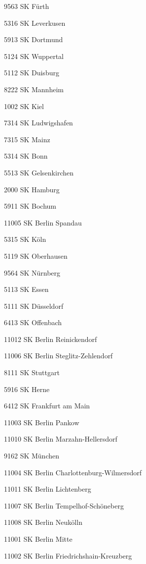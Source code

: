9563  SK Fürth

5316  SK Leverkusen

5913  SK Dortmund

5124  SK Wuppertal

5112  SK Duisburg

8222  SK Mannheim

1002  SK Kiel

7314  SK Ludwigshafen

7315  SK Mainz

5314  SK Bonn

5513  SK Gelsenkirchen

2000  SK Hamburg

5911  SK Bochum

11005  SK Berlin Spandau

5315  SK Köln

5119  SK Oberhausen

9564  SK Nürnberg

5113  SK Essen

5111  SK Düsseldorf

6413  SK Offenbach

11012  SK Berlin Reinickendorf

11006  SK Berlin Steglitz-Zehlendorf

8111  SK Stuttgart

5916  SK Herne

6412  SK Frankfurt am Main

11003  SK Berlin Pankow

11010  SK Berlin Marzahn-Hellersdorf

9162  SK München

11004  SK Berlin Charlottenburg-Wilmersdorf

11011  SK Berlin Lichtenberg

11007  SK Berlin Tempelhof-Schöneberg

11008  SK Berlin Neukölln

11001  SK Berlin Mitte

11002  SK Berlin Friedrichshain-Kreuzberg

